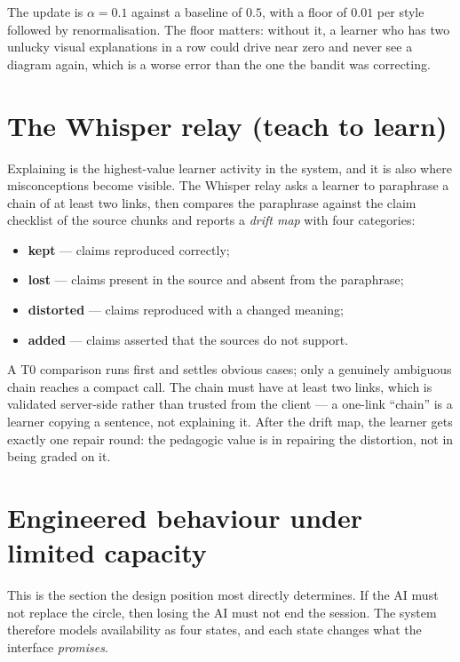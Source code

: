 The update is $\alpha = 0.1$ against a baseline of $0.5$, with a floor of $0.01$ per style
followed by renormalisation. The floor matters: without it, a learner who has two unlucky
visual explanations in a row could drive  near zero and never see a diagram
again, which is a worse error than the one the bandit was correcting.

\section{The Whisper relay (teach to learn)}
\label{sec:whisper}

Explaining is the highest-value learner activity in the system, and it is also where
misconceptions become visible. The Whisper relay asks a learner to paraphrase a chain of at
least two links, then compares the paraphrase against the claim checklist of the source
chunks and reports a \emph{drift map} with four categories:

\begin{itemize}[leftmargin=1.4em,itemsep=1pt]
  \item \textbf{kept} --- claims reproduced correctly;
  \item \textbf{lost} --- claims present in the source and absent from the paraphrase;
  \item \textbf{distorted} --- claims reproduced with a changed meaning;
  \item \textbf{added} --- claims asserted that the sources do not support.
\end{itemize}

A T0 comparison runs first and settles obvious cases; only a genuinely ambiguous chain
reaches a compact call. The chain must have at least two links, which is validated
server-side rather than trusted from the client --- a one-link ``chain'' is a learner
copying a sentence, not explaining it. After the drift map, the learner gets exactly one
repair round: the pedagogic value is in repairing the distortion, not in being graded on it.

\section{Engineered behaviour under limited capacity}
\label{sec:degradation}

This is the section the design position most directly determines. If the AI must not
replace the circle, then losing the AI must not end the session. The system therefore
models availability as four states, and each state changes what the interface
\emph{promises}.

